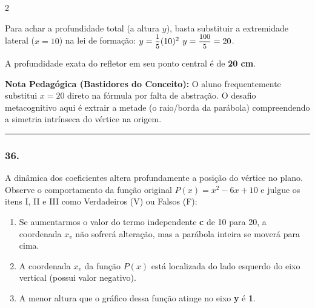 \begin{multicols*}{2}
\begin{tcolorbox}[colback=CorTitUm!5, colframe=CorTitUm, boxrule=1pt, arc=4pt, left=6pt, right=6pt, top=6pt, bottom=6pt]
    Para achar a profundidade total (a altura $y$), basta substituir a extremidade lateral ($x = 10$) na lei de formação:
    $y = \mfrac{1}{5}(10)^2$
    $y = \mfrac{100}{5} = 20$.
    
    A profundidade exata do refletor em seu ponto central é de \textbf{20 cm}.
    \end{tcolorbox}
    \vspace{0.15cm}
    
    \begin{boxexplicacao}
    \textbf{Nota Pedagógica (Bastidores do Conceito):} O aluno frequentemente substitui $x = 20$ direto na fórmula por falta de abstração. O desafio metacognitivo aqui é extrair a metade (o raio/borda da parábola) compreendendo a simetria intrínseca do vértice na origem.
    \end{boxexplicacao}
\fi

\par\vspace{\espacoQuestao}

\noindent\textcolor{CorLinha}{\rule{\linewidth}{0.5pt}} 
\par\vspace{\espacoPreQuestao}
\subsubsection*{36.} 
\begin{enunciadoLiteral}
A dinâmica dos coeficientes altera profundamente a posição do vértice no plano. Observe o comportamento da função original $P(x) = x^2 - 6x + 10$ e julgue os itens I, II e III como Verdadeiros (V) ou Falsos (F):

\begin{enumerate}[label=\Roman*., itemsep=\espacoAlt]
    \item Se aumentarmos o valor do termo independente \textbf{c} de 10 para 20, a coordenada $x_v$ não sofrerá alteração, mas a parábola inteira se moverá para cima.
    \item A coordenada $x_v$ da função $P(x)$ está localizada do lado esquerdo do eixo vertical (possui valor negativo).
    \item A menor altura que o gráfico dessa função atinge no eixo \textbf{y} é \textbf{1}.
\end{enumerate}
\end{enunciadoLiteral}


\end{multicols*}
